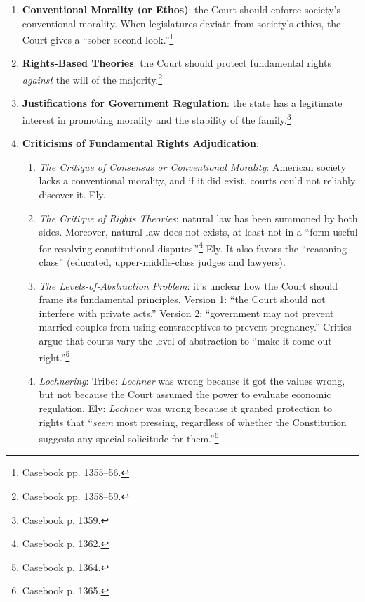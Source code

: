 \begin{enumerate}
    \item \textbf{Conventional Morality (or Ethos)}: the Court should enforce 
    society's conventional morality. When legislatures deviate from society's 
    ethics, the Court gives a ``sober second look.''\footnote{Casebook pp. 
    1355--56.}
    \item \textbf{Rights-Based Theories}: the Court should protect fundamental 
    rights \emph{against} the will of the majority.\footnote{Casebook pp. 
    1358--59.}
    \item \textbf{Justifications for Government Regulation}: the state has a 
    legitimate interest in promoting morality and the stability of the 
    family.\footnote{Casebook p. 1359.}
    \item \textbf{Criticisms of Fundamental Rights Adjudication}:
    \begin{enumerate}
        \item \emph{The Critique of Consensus or Conventional Morality}: 
        American society lacks a conventional morality, and if it did exist, 
        courts could not reliably discover it. Ely.
        \item \emph{The Critique of Rights Theories}: natural law has been 
        summoned by both sides. Moreover, natural law does not exists, at 
        least not in a ``form useful for resolving constitutional 
        disputes.''\footnote{Casebook p. 1362.} Ely. It also favors the 
        ``reasoning class'' (educated, upper-middle-class judges and lawyers).
        \item \emph{The Levels-of-Abstraction Problem}: it's unclear how the 
        Court should frame its fundamental principles. Version 1: ``the Court 
        should not interfere with private acts.'' Version 2: ``government may 
        not prevent married couples from using contraceptives to prevent 
        pregnancy.'' Critics argue that courts vary the level of abstraction 
        to ``make it come out right.''\footnote{Casebook p. 1364.}
        \item \emph{Lochnering}: Tribe: \emph{Lochner} was wrong because it 
        got the values wrong, but not because the Court assumed the power to 
        evaluate economic regulation. Ely: \emph{Lochner} was wrong because it 
        granted protection to rights that ``\emph{seem} most pressing, 
        regardless of whether the Constitution suggests any special solicitude 
        for them.''\footnote{Casebook p. 1365.}
    \end{enumerate}
\end{enumerate}
